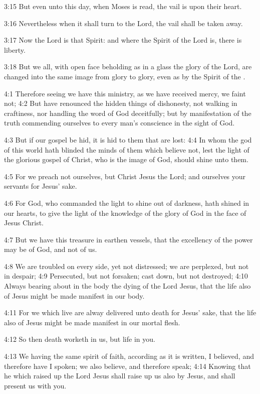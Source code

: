3:15 But even unto this day, when Moses is read, the vail is upon their heart.

3:16 Nevertheless when it shall turn to the Lord, the vail shall be taken away.

3:17 Now the Lord is that Spirit: and where the Spirit of the Lord is, there is liberty.

3:18 But we all, with open face beholding as in a glass the glory of the Lord, are changed into the same image from glory to glory, even as by the Spirit of the \LORD.

4:1 Therefore seeing we have this ministry, as we have received mercy, we faint not; 4:2 But have renounced the hidden things of dishonesty, not walking in craftiness, nor handling the word of God deceitfully; but by manifestation of the truth commending ourselves to every man's conscience in the sight of God.

4:3 But if our gospel be hid, it is hid to them that are lost: 4:4 In whom the god of this world hath blinded the minds of them which believe not, lest the light of the glorious gospel of Christ, who is the image of God, should shine unto them.

4:5 For we preach not ourselves, but Christ Jesus the Lord; and ourselves your servants for Jesus' sake.

4:6 For God, who commanded the light to shine out of darkness, hath shined in our hearts, to give the light of the knowledge of the glory of God in the face of Jesus Christ.

4:7 But we have this treasure in earthen vessels, that the excellency of the power may be of God, and not of us.

4:8 We are troubled on every side, yet not distressed; we are perplexed, but not in despair; 4:9 Persecuted, but not forsaken; cast down, but not destroyed; 4:10 Always bearing about in the body the dying of the Lord Jesus, that the life also of Jesus might be made manifest in our body.

4:11 For we which live are alway delivered unto death for Jesus' sake, that the life also of Jesus might be made manifest in our mortal flesh.

4:12 So then death worketh in us, but life in you.

4:13 We having the same spirit of faith, according as it is written, I believed, and therefore have I spoken; we also believe, and therefore speak; 4:14 Knowing that he which raised up the Lord Jesus shall raise up us also by Jesus, and shall present us with you.

